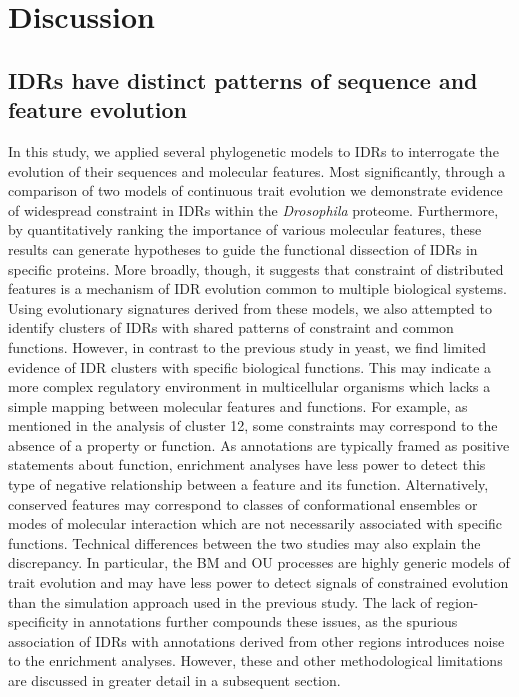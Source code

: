 \section{Discussion}
\subsection{IDRs have distinct patterns of sequence and feature evolution}
In this study, we applied several phylogenetic models to IDRs to interrogate the evolution of their sequences and molecular features. Most significantly, through a comparison of two models of continuous trait evolution we demonstrate evidence of widespread constraint in IDRs within the \textit{Drosophila} proteome. Furthermore, by quantitatively ranking the importance of various molecular features, these results can generate hypotheses to guide the functional dissection of IDRs in specific proteins. More broadly, though, it suggests that constraint of distributed features is a mechanism of IDR evolution common to multiple biological systems. Using evolutionary signatures derived from these models, we also attempted to identify clusters of IDRs with shared patterns of constraint and common functions. However, in contrast to the previous study in yeast, we find limited evidence of IDR clusters with specific biological functions. This may indicate a more complex regulatory environment in multicellular organisms which lacks a simple mapping between molecular features and functions. For example, as mentioned in the analysis of cluster 12, some constraints may correspond to the absence of a property or function. As annotations are typically framed as positive statements about function, enrichment analyses have less power to detect this type of negative relationship between a feature and its function. Alternatively, conserved features may correspond to classes of conformational ensembles or modes of molecular interaction which are not necessarily associated with specific functions. Technical differences between the two studies may also explain the discrepancy. In particular, the BM and OU processes are highly generic models of trait evolution and may have less power to detect signals of constrained evolution than the simulation approach used in the previous study. The lack of region-specificity in annotations further compounds these issues, as the spurious association of IDRs with annotations derived from other regions introduces noise to the enrichment analyses. However, these and other methodological limitations are discussed in greater detail in a subsequent section.

